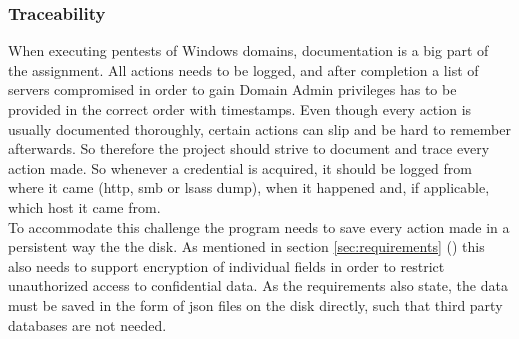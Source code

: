\documentclass{article}
\begin{document}
\subsubsection{Traceability}
When executing pentests of Windows domains, documentation is a big part of the assignment. All actions needs to be logged, and after completion a list of servers compromised in order to gain Domain Admin privileges has to be provided in the correct order with timestamps. Even though every action is usually documented thoroughly, certain actions can slip and be hard to remember afterwards. So therefore the project should strive to document and trace every action made. So whenever a credential is acquired, it should be logged from where it came (\gls{http}, \gls{smb} or \gls{lsass} dump), when it happened and, if applicable, which host it came from.
\\
To accommodate this challenge the program needs to save every action made in a persistent way the the disk. As mentioned in section \ref{sec:requirements} () this also needs to support encryption of individual fields in order to restrict unauthorized access to confidential data. As the requirements also state, the data must be saved in the form of \gls{json} files on the disk directly, such that third party databases are not needed.
\end{document}
